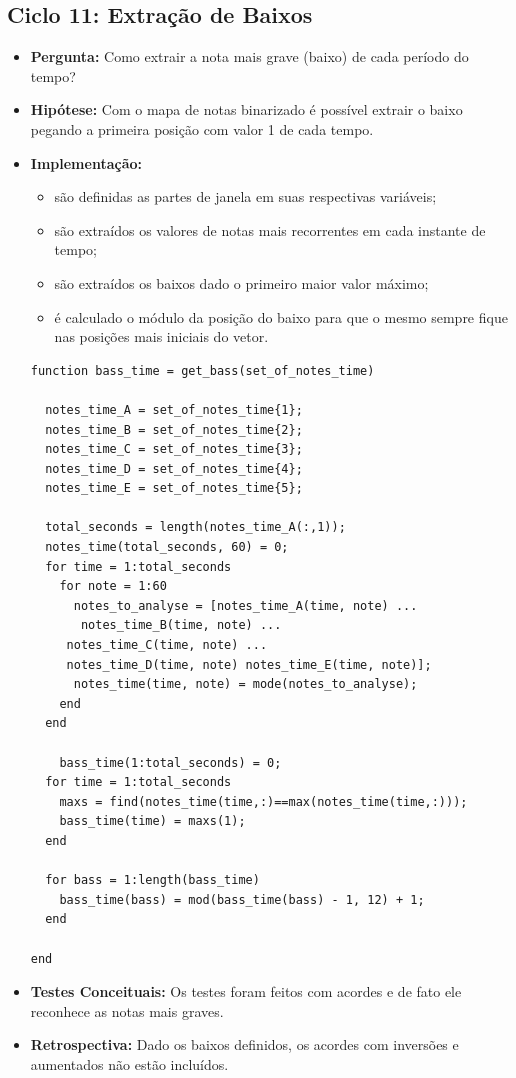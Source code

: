 \subsection{Ciclo 11: Extração de Baixos}
\label{subsec:ciclo_11}
\begin{itemize}
\item \textbf{Pergunta:} Como extrair a nota mais grave (baixo) de cada período do tempo?
\item \textbf{Hipótese:} Com o mapa de notas binarizado é possível extrair o baixo pegando a primeira posição com valor 1 de cada tempo.
\item \textbf{Implementação:}
\begin{itemize} 
	\item são definidas as partes de janela em suas respectivas variáveis;
	\item são extraídos os valores de notas mais recorrentes em cada instante de tempo;
	\item são extraídos os baixos dado o primeiro maior valor máximo;
	\item é calculado o módulo da posição do baixo para que o mesmo sempre fique nas posições mais iniciais do vetor.
\end{itemize}
\begin{lstlisting}
function bass_time = get_bass(set_of_notes_time)

  notes_time_A = set_of_notes_time{1};
  notes_time_B = set_of_notes_time{2};
  notes_time_C = set_of_notes_time{3};
  notes_time_D = set_of_notes_time{4};
  notes_time_E = set_of_notes_time{5};

  total_seconds = length(notes_time_A(:,1));
  notes_time(total_seconds, 60) = 0;
  for time = 1:total_seconds
    for note = 1:60
      notes_to_analyse = [notes_time_A(time, note) ...
       notes_time_B(time, note) ...
     notes_time_C(time, note) ...
     notes_time_D(time, note) notes_time_E(time, note)];
      notes_time(time, note) = mode(notes_to_analyse);
    end
  end

    bass_time(1:total_seconds) = 0;
  for time = 1:total_seconds
    maxs = find(notes_time(time,:)==max(notes_time(time,:)));
    bass_time(time) = maxs(1);
  end

  for bass = 1:length(bass_time)
    bass_time(bass) = mod(bass_time(bass) - 1, 12) + 1;
  end

end
\end{lstlisting}
\item \textbf{Testes Conceituais:} Os testes foram feitos com acordes e de fato ele reconhece as notas mais graves.
\item \textbf{Retrospectiva:} Dado os baixos definidos, os acordes com inversões e aumentados não estão incluídos.
\end{itemize}


